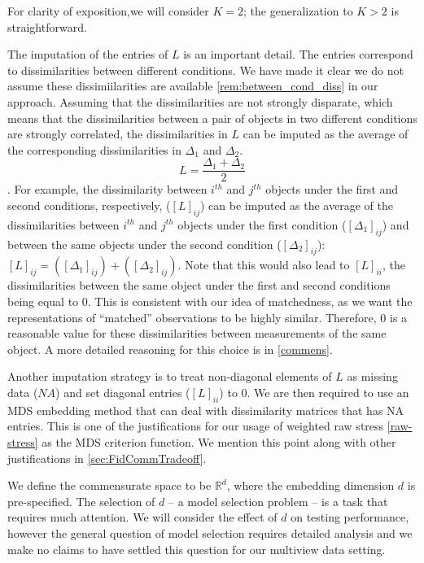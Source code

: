 \documentclass[12pt,oneside,final]{thesis}\usepackage[]{graphicx}\usepackage[]{color}
\begin{document}
\begin{remark}
For clarity of exposition,we will consider $K=2$; the generalization to $K>2$ is straightforward. 
\end{remark}

\begin{remark}
The imputation of the entries of $L$  is an important detail. The entries correspond to dissimilarities between different conditions. We have made it clear we do not assume these dissimiilarities are available  \ref{rem:between_cond_diss} in our approach. Assuming that the dissimilarities are not strongly disparate, which means that the dissimilarities between a pair of objects in two different conditions are strongly  correlated,  the dissimilarities in $L$ can be imputed as the average of the corresponding dissimilarities in $\Delta_1$ and $\Delta_2$. $$L=\frac{\Delta_1 + \Delta_2}{2}$$. For example, the dissimilarity between $i^{th}$ and $j^{th}$ objects under the first and  second conditions, respectively, ($\left[L \right]_{ij}$) can be imputed as the average of the dissimilarities between $i^{th}$ and $j^{th}$ objects under the first condition ($ \left[\Delta_1 \right]_{ij}$) and between the same objects under the second condition ($ \left[\Delta_2 \right]_{ij}$): $[L]_{ij}= ( [\Delta_1]_{ij}) + ( [\Delta_2]_{ij})$. Note that this would also lead to $[L]_{ii}$, the dissimilarities between the same object  under the first and  second conditions  being equal to $0$. This is consistent with our idea of matchedness, as we want the representations of ``matched'' observations to be highly similar. Therefore, $0$ is a reasonable value for these dissimilarities between measurements of the same object.  A more detailed reasoning for this choice is  in \ref{commens}.

Another imputation strategy is to treat non-diagonal elements of $L$ as missing data ($NA$) and set diagonal entries ($[L]_{ii}$)  to 0. We are then required to use an MDS embedding method that can deal with dissimilarity matrices that has NA entries. This is one of the justifications for our usage of weighted raw stress \ref{raw-stress} as the MDS criterion function. We mention this point along with other justifications in  \autoref{sec:FidCommTradeoff}.
\label{rem:imputationofdiss}
\end{remark}


We define the commensurate space to be  $\mathbb{R}^d$, where the embedding dimension $d$ is pre-specified. The selection of $d$ -- a model selection problem -- is  a task that requires much attention. We will  consider the effect  of $d$ on testing performance, however the general question of model selection requires detailed analysis and we make no claims to have settled this question for our multiview data setting.
\end{document}
